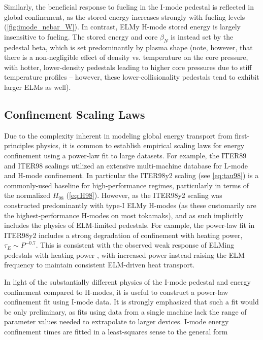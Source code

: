 Similarly, the beneficial response to fueling in the I-mode pedestal is reflected in global confinement, as the stored energy increases strongly with fueling levels (\cref{fig:imode_nebar_W}).    In contrast, ELMy H-mode stored energy is largely insensitive to fueling.  The stored energy and core $\beta_N$ is instead set by the pedestal beta, which is set predominantly by plasma shape (note, however, that there is a non-negligible effect of density vs. temperature on the core pressure, with hotter, lower-density pedestals leading to higher core pressures due to stiff temperature profiles -- however, these lower-collisionality pedestals tend to exhibit larger ELMs as well).

\subsection{Confinement Scaling Laws}\label{subsec:imode_powerlaws}

Due to the complexity inherent in modeling global energy transport from first-principles physics, it is common to establish empirical scaling laws for energy confinement using a power-law fit to large datasets.  For example, the ITER89 \cite{Yushmanov1990} and ITER98 \cite{ITER1999} scalings utilized an extensive multi-machine database \cite{Christiansen1992} for L-mode and H-mode confinement.  In particular the ITER98y2 scaling (see \cref{eq:tau98}) is a commonly-used baseline for high-performance regimes, particularly in terms of the normalized $H_{98}$ (\cref{eq:H98}).  However, as the ITER98y2 scaling was constructed predominantly with type-I ELMy H-modes (as these customarily are the highest-performance H-modes on most tokamaks), and as such implicitly includes the physics of ELM-limited pedestals.  For example, the power-law fit in ITER98y2 includes a strong degradation of confinement with heating power, $\tau_E \sim P^{-0.7}$.  This is consistent with the observed weak response of ELMing pedestals with heating power \cite{Snyder2007}, with increased power instead raising the ELM frequency to maintain consistent ELM-driven heat transport.

In light of the substantially different physics of the I-mode pedestal and energy confinement compared to H-modes, it is useful to construct a power-law confinement fit using I-mode data.  It is strongly emphasized that such a fit would be only preliminary, as fits using data from a single machine lack the range of parameter values needed to extrapolate to larger devices.  I-mode energy confinement times are fitted in a least-squares sense to the general form

